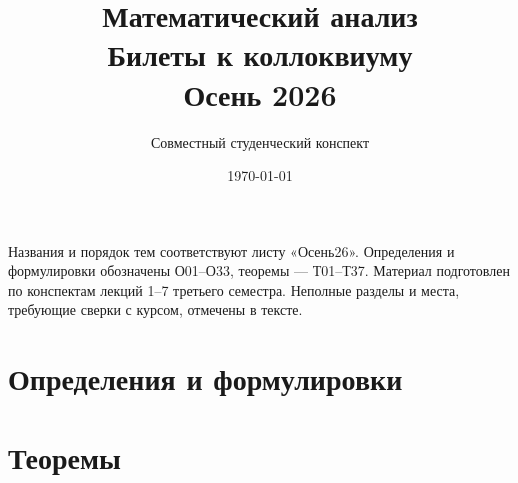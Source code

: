 \documentclass[a4paper,12pt]{article}
\title{Математический анализ\\Билеты к коллоквиуму\\Осень 2026}
\author{Совместный студенческий конспект}
\date{\today}
\begin{document}
\maketitle
\noindent Названия и порядок тем соответствуют листу «Осень26».
Определения и формулировки обозначены О01--О33, теоремы --- Т01--Т37.
Материал подготовлен по конспектам лекций 1--7 третьего семестра.
Неполные разделы и места, требующие сверки с курсом, отмечены в тексте.
\tableofcontents
\clearpage
\part*{Определения и формулировки}

\clearpage
\part*{Теоремы}

\end{document}
